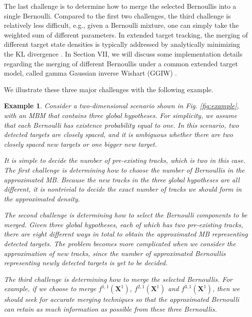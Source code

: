 \documentclass[journal]{IEEEtran}
\begin{document}
The last challenge is to determine how to merge the selected Bernoullis into a single Bernoulli. Compared to the first two challenges, the third challenge is relatively less difficult, e.g., given a Bernoulli mixture, one can simply take the weighted sum of different parameters. In extended target tracking, the merging of different target state densities is typically addressed by analytically minimizing the KL divergence \cite{phdextended,gammareduction}. In Section VII, we will discuss some implementation details regarding the merging of different Bernoullis under a common extended target model, called gamma Gaussian inverse Wishart (GGIW) \cite{phdextended,cphdextended}. 

We illustrate these three major challenges with the following example. 
\newtheorem{example}{Example}[section]
\begin{example}
\emph{Consider a two-dimensional scenario shown in Fig. \ref{fig:example}, with an MBM that contains three global hypotheses. For simplicity, we assume that each Bernoulli has existence probability equal to one. In this scenario, two detected targets are closely spaced, and it is ambiguous whether there are two closely spaced new targets or one bigger new target.}

\emph{It is simple to decide the number of pre-existing tracks, which is two in this case. The first challenge is determining how to choose the number of Bernoullis in the approximated MB. Because the new tracks in the three global hypotheses are all different, it is nontrivial to decide the exact number of tracks we should form in the approximated density.}

\emph{The second challenge is determining how to select the Bernoulli components to be merged. Given three global hypotheses, each of which has two pre-existing tracks, there are eight different ways in total to obtain the approximated MB representing detected targets. The problem becomes more complicated when we consider the approximation of new tracks, since the number of approximated Bernoullis representing newly detected targets is yet to be decided.}

\emph{The third challenge is determining how to merge the selected Bernoullis. For example, if we choose to merge $f^{1,1}(\mathbf{X}^1)$, $f^{2,1}(\mathbf{X}^1)$ and $f^{3,1}(\mathbf{X}^1)$, then we should seek for accurate merging techniques so that the approximated Bernoulli can retain as much information as possible from these three Bernoullis.}
\\\IEEEQEDopen
\end{example}
\end{document}
